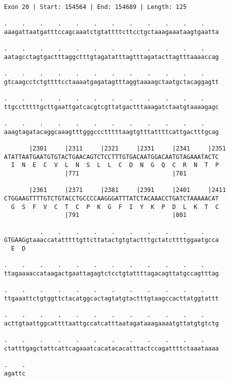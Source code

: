 \documentclass{article}
\begin{document}
\begin{Verbatim}
Exon 20 | Start: 154564 | End: 154689 | Length: 125
 
.    .    .    .    .    .    .    .    .    .    .    .    
aaagattaatgatttccagcaaatctgtattttcttcctgctaaagaaataagtgaatta
  
.    .    .    .    .    .    .    .    .    .    .    .    
aatagcctagtgactttaggctttgtagatatttagtttagatacttagtttaaaaccag
  
.    .    .    .    .    .    .    .    .    .    .    .    
gtcaagcctctgttttcctaaaatgagatagtttaggtaaaagctaatgctacaggagtt
  
.    .    .    .    .    .    .    .    .    .    .    .    
ttgcctttttgcttgaattgatcacgtcgttatgactttaaagatctaatgtaaaagagc
  
.    .    .    .    .    .    .    .    .    .    .    .    
aaagtagatacaggcaaagtttgggccctttttaagtgtttattttcattgactttgcag
  
       |2301     |2311     |2321     |2331     |2341     |2351
ATATTAATGAATGTGTACTGAACAGTCTCCTTTGTGACAATGGACAATGTAGAAATACTC
  I  N  E  C  V  L  N  S  L  L  C  D  N  G  Q  C  R  N  T  P
                 |771                          |781         
  
       |2361     |2371     |2381     |2391     |2401     |2411
CTGGAAGTTTTGTCTGTACCTGCCCCAAGGGATTTATCTACAAACCTGATCTAAAAACAT
  G  S  F  V  C  T  C  P  K  G  F  I  Y  K  P  D  L  K  T  C
                 |791                          |801         
  
          .    .    .    .    .    .    .    .    .    .    
GTGAAGgtaaaccatatttttgttcttatactgtgtactttgctatcttttggaatgcca
  E  D                                                      
  
.    .    .    .    .    .    .    .    .    .    .    .    
ttagaaaaccataagactgaattagagtctcctgtattttagacagttatgccagtttag
  
.    .    .    .    .    .    .    .    .    .    .    .    
ttgaaattctgtggttctacatggcactagtatgtactttgtaagccacttatggtattt
  
.    .    .    .    .    .    .    .    .    .    .    .    
acttgtaattggcattttaattgccatcatttaatagataaagaaaatgttatgtgtctg
  
.    .    .    .    .    .    .    .    .    .    .    .    
ctatttgagctattcattcagaaatcacatacacatttactccagattttctaaataaaa
  
.    .
agattc
\end{Verbatim}
\newpage
\end{document}

